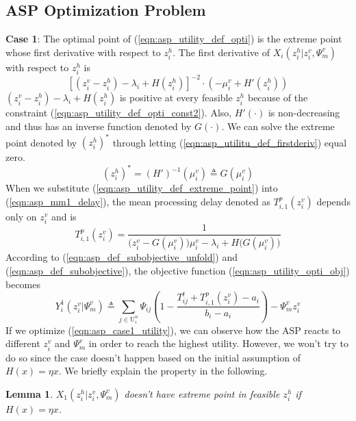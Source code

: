 \documentclass[conference]{IEEEtran}
\newtheorem{lemma}{Lemma}
\begin{document}
\subsection{ASP Optimization Problem}
\textbf{Case 1}: The optimal point of (\ref{eqn:asp_utility_def_opti}) is the extreme point whose first derivative with respect to $z_i^h$. The first derivative of $X_i(z_i^h|z_i^v,\Psi_m^v)$ with respect to $z_i^h$ is
\begin{equation} \label{eqn:asp_utilitu_def_firstderiv}
[(z_i^v - z_i^h) - \lambda_i + H(z_i^h)]^{-2} \cdot (-\mu_i^v + H'(z_i^h))
\end{equation}
$(z_i^v - z_i^h) - \lambda_i + H(z_i^h)$ is positive at every feasible $z_i^h$ because of the constraint (\ref{eqn:asp_utility_def_opti_const2}). Also, $H'(\cdot)$ is non-decreasing and thus has an inverse function denoted by $G(\cdot)$. We can solve the extreme point denoted by $(z_i^h)^*$ through letting (\ref{eqn:asp_utilitu_def_firstderiv}) equal zero.
\begin{equation} \label{eqn:asp_utility_def_extreme_point}
(z_i^h)^* = (H')^{-1}(\mu_i^v) \triangleq G(\mu_i^v)
\end{equation}
When we substitute (\ref{eqn:asp_utility_def_extreme_point}) into (\ref{eqn:asp_mm1_delay}), the mean processing delay denoted as $T_{i,1}^p(z_i^v)$ depends only on $z_i^v$ and is
\begin{equation}
T_{i,1}^p(z_i^v) = \frac{1}{\big(z_i^v - G(\mu_i^v)\big)\mu_i^v - \lambda_i + H\big(G(\mu_i^v)\big)}
\end{equation}
According to (\ref{eqn:asp_def_subobjective_unfold}) and (\ref{eqn:asp_def_subobjective}), the objective function (\ref{eqn:asp_utility_opti_obj}) becomes
\begin{equation}\label{eqn:asp_case1_utility}
Y_i^1(z_i^v|\Psi_m^v) \triangleq \sum_{j \in \mathrm{U}_i^n}\Psi_{ij}(1-\frac{T_{ij}^t + T_{i,1}^p(z_i^v)-a_i}{b_i-a_i}) - \Psi_m^vz_i^v
\end{equation}
If we optimize (\ref{eqn:asp_case1_utility}), we can observe how the ASP reacts to different $z_i^v$ and $\Psi_m^v$ in order to reach the highest utility. However, we won't try to do so since the case doesn't happen based on the initial assumption of $H(x) = \eta{x}$. We briefly explain the property in the following.
\begin{lemma} \label{lemma:asp_case1_not_exist}
$X_1(z_i^h|z_i^v,\Psi_m^v)$ doesn't have extreme point in feasible $z_i^h$ if $H(x) = \eta{x}$.
\end{lemma}
\end{document}
